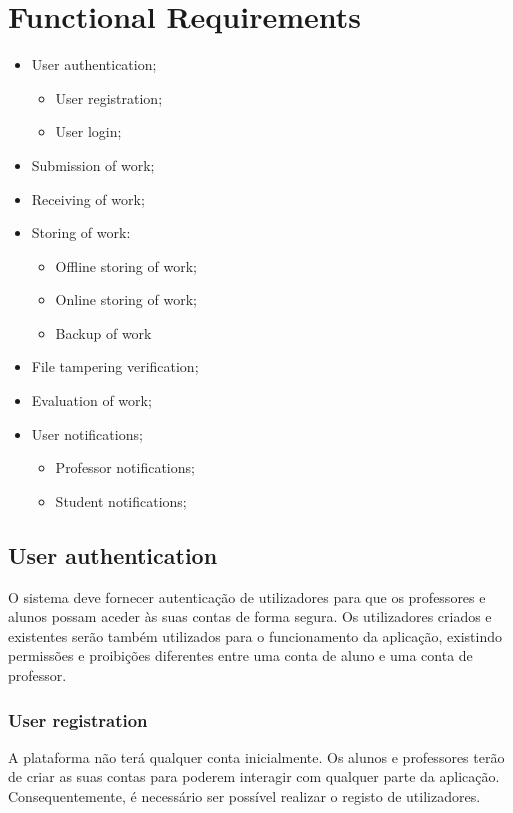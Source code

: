 \documentclass[10pt]{article}
\begin{document}
\newpage

\tableofcontents{}

\newpage

\newpage

\section{Functional Requirements}
\begin{itemize}
    \item User authentication;
        \begin{itemize}
            \item User registration;
            \item User login;
        \end{itemize}
    \item Submission of work;
    \item Receiving of work;
    \item Storing of work:
        \begin{itemize}
            \item Offline storing of work;
            \item Online storing of work;
            \item Backup of work
        \end{itemize}
    \item File tampering verification;
    \item Evaluation of work;
    \item User notifications;
        \begin{itemize}
            \item Professor notifications;
            \item Student notifications;
        \end{itemize}
\end{itemize}

\newpage

\subsection{User authentication}
O sistema deve fornecer autenticação de utilizadores para que os 
professores e alunos possam aceder às suas contas de forma segura. 
Os utilizadores criados e existentes serão também utilizados para 
o funcionamento da aplicação, existindo permissões e proibições diferentes
entre uma conta de aluno e uma conta de professor.

\subsubsection{User registration}
A plataforma não terá qualquer conta inicialmente. Os alunos e professores terão
de criar as suas contas para poderem interagir com qualquer parte da aplicação.
Consequentemente, é necessário ser possível realizar o registo de utilizadores.
\end{document}
